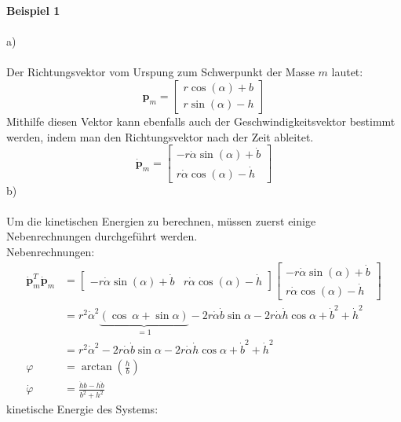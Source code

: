 \noindent
\textbf{Beispiel 1} \\ \\
a) \\ \\
Der Richtungsvektor vom Urspung zum Schwerpunkt der Masse $m$ lautet:
\[
	\textbf{p}_m = \left[ \begin {array}{c} r\cos \left( \alpha \right) +b
	\\ r\sin \left( \alpha \right) -h\end {array}
	\right]	
\]
Mithilfe diesen Vektor kann ebenfalls auch der Geschwindigkeitsvektor bestimmt werden, indem man den Richtungsvektor nach der Zeit ableitet.
\[
	\dot{\textbf{p}}_m =\left[ \begin {array}{c} -r \dot{\alpha}
	  \sin \left( \alpha 
	\right) + \dot{b} \\ 
	r \dot{\alpha} \cos \left( \alpha  \right) -
		\dot{h} \end {array} \right] 
\]
b) \\ \\
Um die kinetischen Energien zu berechnen, müssen zuerst einige Nebenrechnungen durchgeführt werden.\\
Nebenrechnungen:
\begin{align}
	\dot{\textbf{p}}_m^T \dot{\textbf{p}}_m &= \left[ \begin{matrix}
		-r\dot{\alpha}\sin \left( \alpha \right) + \dot{b} & r\dot{\alpha}\cos \left( \alpha \right) -\dot{h}
	\end{matrix}\right] \left[ \begin {array}{c} -r \dot{\alpha}
	\sin \left( \alpha 
	\right) + \dot{b} \\ 
	r \dot{\alpha} \cos \left( \alpha  \right) -
	\dot{h} \end {array} \right] \\
	&= r^2\dot{\alpha}^2\underbrace{\left(\cos \ \alpha  + \sin  \alpha\right)  }_{=1} -2r\dot{\alpha}\dot{b}\sin\alpha - 2r\dot{\alpha}\dot{h}\cos\alpha + \dot{b}^2 + \dot{h}^2 \\
	&= r^2\dot{\alpha}^2 -2r\dot{\alpha}\dot{b}\sin\alpha - 2r\dot{\alpha}\dot{h}\cos\alpha + \dot{b}^2 + \dot{h}^2 \\
	\varphi &= \arctan\left(\frac{h}{b}\right) \\
	\dot{\varphi} &= \frac{\dot{h}b - h\dot{b}}{b^2 + h^2}
\end{align}
kinetische Energie des Systems:
